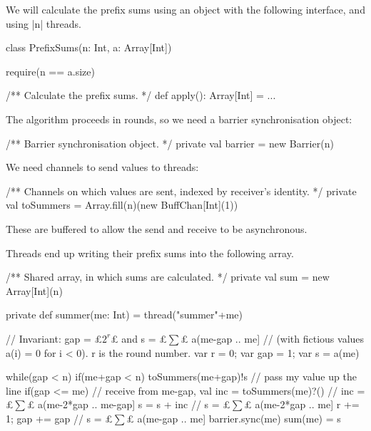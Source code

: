 
\begin{slide}

We will calculate the prefix sums using an object with the following
interface, and using |n| threads. 
%
\begin{scala}
class PrefixSums(n: Int, a: Array[Int]){
  require(n == a.size)

  /** Calculate the prefix sums. */
  def apply(): Array[Int] = ...
}
\end{scala}
\end{slide}


\begin{slide}

The algorithm proceeds in rounds, so we need a barrier synchronisation object:
%
\begin{scala}
  /** Barrier synchronisation object. */
  private val barrier = new Barrier(n)
\end{scala}
%
We need channels to send values to threads:
\begin{scala}
  /** Channels on which values are sent, indexed by receiver's identity. */
  private val toSummers = Array.fill(n)(new BuffChan[Int](1))
\end{scala}
%
These are buffered to allow the send and receive to be asynchronous.  

Threads end up writing their prefix sums into the following array. 
\begin{scala}
  /** Shared array, in which sums are calculated. */
  private val sum = new Array[Int](n)
\end{scala}
\end{slide}


\begin{slide}

\begin{scala}
  private def summer(me: Int) = thread("summer"+me){
    // Invariant: gap = £$2^r$£ and s = £$\sum$£ a(me-gap .. me]
    // (with fictious values a(i) = 0 for i < 0).  r is the round number.
    var r = 0; var gap = 1; var s = a(me)

    while(gap < n){
      if(me+gap < n) toSummers(me+gap)!s // pass my value up the line
      if(gap <= me){                    // receive from me-gap,
	val inc = toSummers(me)?()  // inc = £$\sum$£ a(me-2*gap .. me-gap]
	s = s + inc                     // s = £$\sum$£ a(me-2*gap .. me]
      }
      r += 1; gap += gap             // s = £$\sum$£ a(me-gap .. me]
      barrier.sync(me)
    }
    sum(me) = s
  }
\end{scala}
\end{slide}

